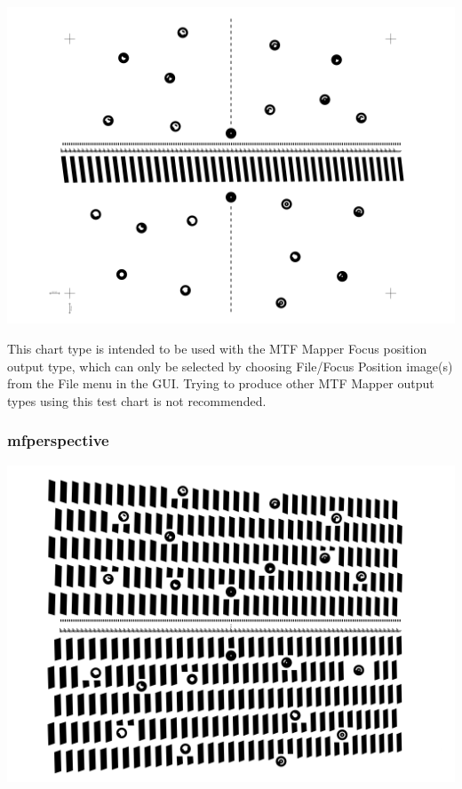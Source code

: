 \documentclass[a4paper]{article}
\begin{document}
\parbox{\textwidth}{
\centering
\includegraphics[width=\textwidth]{figures/chart_focus}
}
\vspace{1ex}

This chart type is intended to be used with the MTF Mapper \textsf{Focus
position} output type, which can only be selected by choosing 
\textsf{File/Focus Position image(s)} from the \textsf{File} menu in the GUI.
Trying to produce other MTF Mapper output types using
this test chart is not recommended.

\subsubsection{mfperspective}

\parbox{\textwidth}{
\centering
\includegraphics[width=\textwidth]{figures/chart_mfperspective}
}
\end{document}
